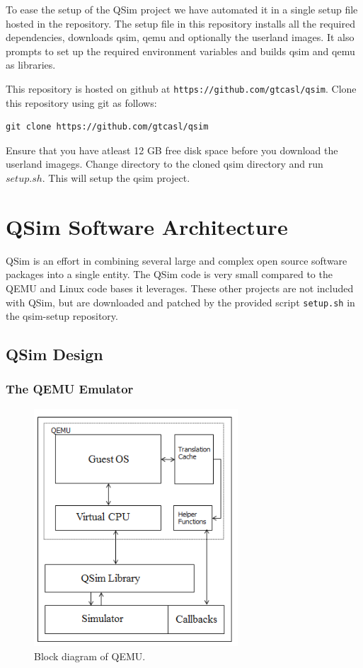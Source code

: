 \documentclass[letterpaper, 10pt]{book}
\newcommand{\url}[1]{\texttt{#1}}
\begin{document}
To ease the setup of the QSim project we have automated it in a
single setup file hosted in the repository. The setup file in this
repository installs all the required dependencies, downloads qsim, qemu and
optionally the userland images. It also prompts to set up the required
environment variables and builds qsim and qemu as libraries.

This repository is hosted on github at
\url{https://github.com/gtcasl/qsim}. Clone this repository using git as
follows: \\
\begin{lstlisting}[frame=none]
 git clone https://github.com/gtcasl/qsim
\end{lstlisting}

Ensure that you have atleast 12 GB free disk space before you download the
userland imagegs. Change directory to the cloned qsim directory and run
$setup.sh$. This will setup the qsim project.

\chapter{QSim Software Architecture} \label{chap:arch}
QSim is an effort in combining several large and complex open source software
packages into a single entity. The QSim code is very small compared to the
QEMU and Linux code bases it leverages. These other projects are not included
with QSim, but are downloaded and patched by the provided script
\texttt{setup.sh} in the qsim-setup repository.

\section{QSim Design}

\subsection{The QEMU Emulator}

\begin{figure}
\begin{center}
\includegraphics[width=3in]{qsim_architecture}
\caption{Block diagram of QEMU.}
\label{fig:qsim}
\end{center}
\end{figure}
\end{document}
